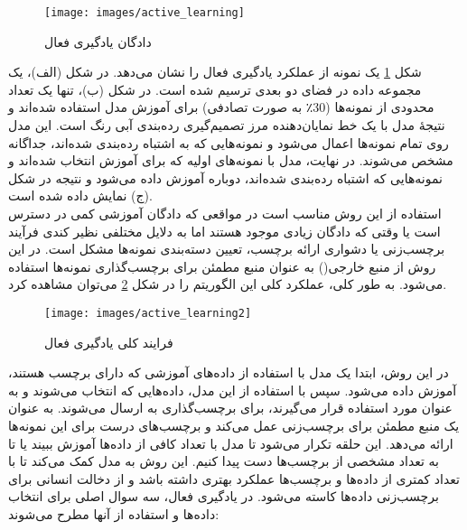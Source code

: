 \begin{figure}[h]
\centerline{\texttt{[image: images/active\_learning]}}
\caption[\hspace{0.5em}دادگان یادگیری فعال]{دادگان یادگیری فعال\cite{zhao2021dsal}}
\label{fig:active_learning}
\end{figure}
شکل \ref{fig:active_learning} یک نمونه از عملکرد یادگیری فعال را نشان می‌دهد. در شکل (الف)، یک مجموعه داده در فضای دو بعدی ترسیم شده است. در شکل (ب)، تنها یک تعداد محدودی از نمونه‌ها (30٪ به صورت تصادفی) برای آموزش مدل استفاده شده‌اند و نتیجهٔ مدل با یک خط نمایان‌دهنده مرز تصمیم‌گیری رده‌بندی آبی رنگ است. این مدل روی تمام نمونه‌ها اعمال می‌شود و نمونه‌هایی که به اشتباه رده‌بندی شده‌اند، جداگانه مشخص می‌شوند. در نهایت، مدل با نمونه‌های اولیه که برای آموزش انتخاب شده‌اند و نمونه‌هایی که اشتباه رده‌بندی شده‌اند، دوباره آموزش داده می‌شود و نتیجه در شکل (ج) نمایش داده شده است.
\\
استفاده از این روش مناسب است در مواقعی که دادگان آموزشی کمی در دسترس است یا وقتی که دادگان زیادی موجود هستند اما به دلایل مختلفی نظیر کندی فرآیند برچسب‌زنی یا دشواری ارائه برچسب، تعیین دسته‌بندی نمونه‌ها مشکل است. در این روش از منبع خارجی()  به عنوان منبع مطمئن برای برچسب‌گذاری نمونه‌ها استفاده می‌شود. به طور کلی، عملکرد کلی این الگوریتم را در شکل \ref{fig:active_learning2} می‌توان مشاهده کرد.

\begin{figure}[h]
\centerline{\texttt{[image: images/active\_learning2]}}
\caption[\hspace{0.5em}فرایند کلی یادگیری فعال]{فرایند کلی یادگیری فعال\cite{zhao2021dsal}}
\label{fig:active_learning2}
\end{figure}
در این روش، ابتدا یک مدل با استفاده از داده‌های آموزشی که دارای برچسب هستند، آموزش داده می‌شود. سپس با استفاده از این مدل، داده‌هایی که انتخاب می‌شوند و به عنوان  مورد استفاده قرار می‌گیرند، برای برچسب‌گذاری به  ارسال می‌شوند.  به عنوان یک منبع مطمئن برای برچسب‌زنی عمل می‌کند و برچسب‌های درست برای این نمونه‌ها ارائه می‌دهد. این حلقه تکرار می‌شود تا مدل با تعداد کافی از داده‌ها آموزش ببیند یا تا به تعداد مشخصی از برچسب‌ها دست پیدا کنیم. این روش به مدل کمک می‌کند تا با تعداد کمتری از داده‌ها و برچسب‌ها عملکرد بهتری داشته باشد و از دخالت انسانی برای برچسب‌زنی داده‌ها کاسته می‌شود.
در یادگیری فعال، سه سوال اصلی برای انتخاب داده‌ها و استفاده از آنها مطرح می‌شوند:

